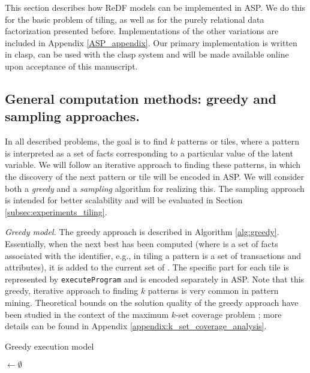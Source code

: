 This section describes how ReDF models can be implemented in ASP. We do this for the basic problem of tiling, as well as for the purely relational data factorization presented before. Implementations of the other variations are included in Appendix \ref{ASP_appendix}. Our primary implementation is written in clasp, can be used with the clasp system \citep{aspbook,BrewkaCACM} and will be made available online upon acceptance of this manuscript.

\subsection{General computation methods: greedy and sampling approaches.} 
In all described problems, the goal is to find $k$ patterns or tiles, where a pattern is interpreted as a set of facts corresponding to a particular value of the latent variable. 
We will follow an iterative approach to finding these patterns,
in which the discovery of the next pattern or tile will be encoded in ASP.
We will consider both a {\em greedy} and a {\em sampling} algorithm
for realizing this. The sampling approach is intended for better scalability and will
be evaluated in Section \ref{subsec:experiments_tiling}.

\textit{Greedy model.}
The greedy approach is described  in  Algorithm \ref{alg:greedy}. Essentially, 
when the next best \tile has been computed (where \tile is a set of facts associated with the \tile identifier, e.g., in tiling a pattern is a set of transactions and attributes), it is added to the current set of \tiles. The specific part for each tile is represented by \texttt{executeProgram} and is encoded separately in ASP. Note that this greedy, iterative approach to finding $k$ patterns is very common in pattern mining. 
\changesb Theoretical bounds on the solution quality of the greedy approach have been studied in the context of the maximum $k$-set coverage problem \citep{max_k_set_cover1, max_k_set_cover2}; more details can be found in Appendix \ref{appendix:k_set_coverage_analysis}. \changese
\begin{algorithm}[thb]
  \small
 \caption{Greedy execution model}
 \label{alg:greedy}
 \tiles$ \gets \emptyset$\;
  \normalsize
\end{algorithm}

